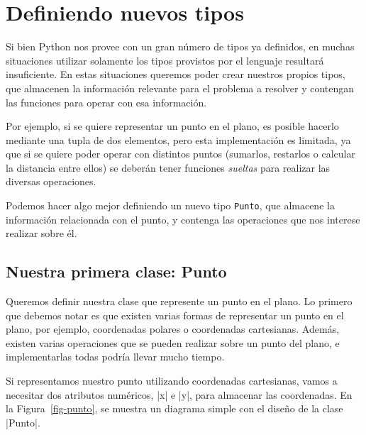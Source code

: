\section{Definiendo nuevos tipos}

Si bien Python nos provee con un gran número de tipos ya definidos, en
muchas situaciones utilizar solamente los tipos provistos por el lenguaje
resultará insuficiente.  En estas situaciones queremos poder crear nuestros
propios tipos, que almacenen la información relevante para el problema a
resolver y contengan las funciones para operar con esa información.

Por ejemplo, si se quiere representar un punto en el plano, es posible
hacerlo mediante una tupla de dos elementos, pero esta implementación es
limitada, ya que si se quiere poder operar con distintos puntos (sumarlos,
restarlos o calcular la distancia entre ellos) se deberán tener funciones
\emph{sueltas} para realizar las diversas operaciones.

Podemos hacer algo mejor definiendo un nuevo tipo \lstinline!Punto!, que almacene
la información relacionada con el punto, y contenga las operaciones que nos
interese realizar sobre él.

\subsection{Nuestra primera clase: Punto}

Queremos definir nuestra clase que represente un punto en el plano.
Lo primero que debemos notar es que existen varias formas de representar un
punto en el plano, por ejemplo, coordenadas polares o coordenadas
cartesianas.
Además, existen varias operaciones que se pueden realizar sobre un punto
del plano, e implementarlas todas podría llevar mucho tiempo.

Si representamos nuestro punto utilizando coordenadas cartesianas,
vamos a necesitar dos atributos numéricos, |x| e |y|, para almacenar las
coordenadas. En la Figura~\ref{fig-punto}, se muestra un diagrama simple con el
diseño de la clase |Punto|.


